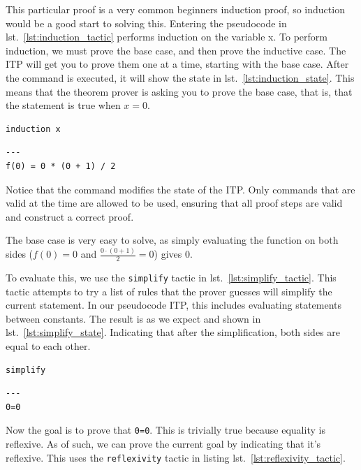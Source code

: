 \documentclass[
]{article}
\begin{document}
This particular proof is a very common beginners induction proof, so
induction would be a good start to solving this. Entering the pseudocode
in lst.~\ref{lst:induction_tactic} performs induction on the variable x.
To perform induction, we must prove the base case, and then prove the
inductive case. The ITP will get you to prove them one at a time,
starting with the base case. After the command is executed, it will show
the state in lst.~\ref{lst:induction_state}. This means that the theorem
prover is asking you to prove the base case, that is, that the statement
is true when \(x = 0\).

\hypertarget{lst:induction_tactic}{%
\label{lst:induction_tactic}}%
\begin{verbatim}
induction x
\end{verbatim}

\hypertarget{lst:induction_state}{%
\label{lst:induction_state}}%
\begin{verbatim}
---
f(0) = 0 * (0 + 1) / 2
\end{verbatim}

Notice that the command modifies the state of the ITP. Only commands
that are valid at the time are allowed to be used, ensuring that all
proof steps are valid and construct a correct proof.

The base case is very easy to solve, as simply evaluating the function
on both sides (\(f(0) = 0\) and \(\frac {0 \cdot (0 + 1)}{2} = 0\))
gives 0.

To evaluate this, we use the \texttt{simplify} tactic in
lst.~\ref{lst:simplify_tactic}. This tactic attempts to try a list of
rules that the prover guesses will simplify the current statement. In
our pseudocode ITP, this includes evaluating statements between
constants. The result is as we expect and shown in
lst.~\ref{lst:simplify_state}. Indicating that after the simplification,
both sides are equal to each other.

\hypertarget{lst:simplify_tactic}{%
\label{lst:simplify_tactic}}%
\begin{verbatim}
simplify
\end{verbatim}

\hypertarget{lst:simplify_state}{%
\label{lst:simplify_state}}%
\begin{verbatim}
---
0=0
\end{verbatim}

Now the goal is to prove that \texttt{0=0}. This is trivially true
because equality is reflexive. As of such, we can prove the current goal
by indicating that it's reflexive. This uses the \texttt{reflexivity}
tactic in listing lst.~\ref{lst:reflexivity_tactic}.
\end{document}
